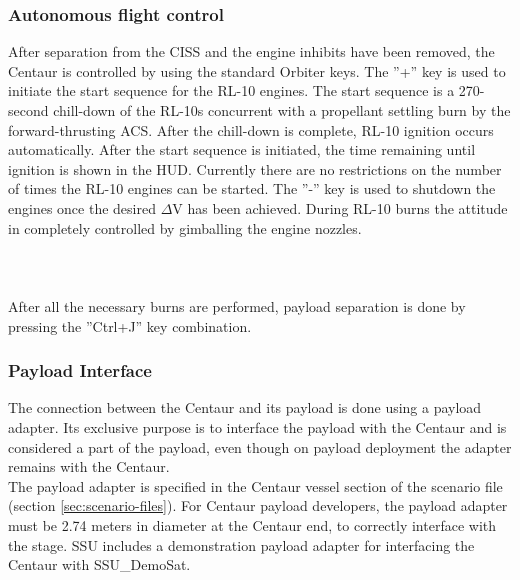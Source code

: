 \documentclass[Space_Shuttle_Ultra_Manual.tex]{subfiles}
\begin{document}
\begin{multicols*}{2}
\subsubsection{Autonomous flight control}
After separation from the CISS and the engine inhibits have been removed, the Centaur is controlled by using the standard Orbiter keys. The ''+'' key is used to initiate the start sequence for the RL-10 engines. The start sequence is a 270-second chill-down of the RL-10s concurrent with a propellant settling burn by the forward-thrusting ACS. After the chill-down is complete, RL-10 ignition occurs automatically. After the start sequence is initiated, the time remaining until ignition is shown in the HUD. Currently there are no restrictions on the number of times the RL-10 engines can be started. The ''-'' key is used to shutdown the engines once the desired $\Delta$V has been achieved. During RL-10 burns the attitude in completely controlled by gimballing the engine nozzles.
\\
\\
\\
\\
After all the necessary burns are performed, payload separation is done by pressing the ''Ctrl+J'' key combination.

\subsubsection{Payload Interface}
The connection between the Centaur and its payload is done using a payload adapter. Its exclusive purpose is to interface the payload with the Centaur and is considered a part of the payload, even though on payload deployment the adapter remains with the Centaur.\\
The payload adapter is specified in the Centaur vessel section of the scenario file (section \ref{sec:scenario-files}).
For Centaur payload developers, the payload adapter must be 2.74 meters in diameter at the Centaur end, to correctly interface with the stage. SSU includes a demonstration payload adapter for interfacing the Centaur with SSU\_DemoSat.

\end{multicols*}
\newpage
\end{document}
